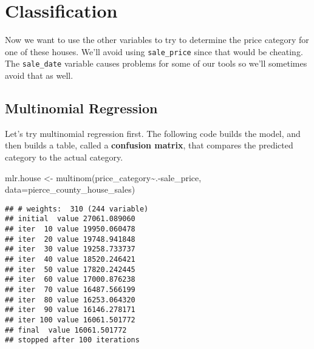 \documentclass[
]{article}
\newenvironment{Shaded}{\begin{snugshade}}{\end{snugshade}}
\newcommand{\AttributeTok}[1]{\textcolor[rgb]{0.77,0.63,0.00}{#1}}
\newcommand{\FunctionTok}[1]{\textcolor[rgb]{0.00,0.00,0.00}{#1}}
\newcommand{\NormalTok}[1]{#1}
\newcommand{\OtherTok}[1]{\textcolor[rgb]{0.56,0.35,0.01}{#1}}
\newcommand{\SpecialCharTok}[1]{\textcolor[rgb]{0.00,0.00,0.00}{#1}}
\begin{document}
\hypertarget{classification}{%
\section{Classification}\label{classification}}

Now we want to use the other variables to try to determine the price
category for one of these houses. We'll avoid using \texttt{sale\_price}
since that would be cheating. The \texttt{sale\_date} variable causes
problems for some of our tools so we'll sometimes avoid that as well.

\hypertarget{multinomial-regression}{%
\subsection{Multinomial Regression}\label{multinomial-regression}}

Let's try multinomial regression first. The following code builds the
model, and then builds a table, called a \textbf{confusion matrix}, that
compares the predicted category to the actual category.

\begin{Shaded}
\begin{Highlighting}[]
\NormalTok{mlr.house }\OtherTok{\textless{}{-}} \FunctionTok{multinom}\NormalTok{(price\_category}\SpecialCharTok{\textasciitilde{}}\NormalTok{.}\SpecialCharTok{{-}}\NormalTok{sale\_price, }\AttributeTok{data=}\NormalTok{pierce\_county\_house\_sales)}
\end{Highlighting}
\end{Shaded}

\begin{verbatim}
## # weights:  310 (244 variable)
## initial  value 27061.089060 
## iter  10 value 19950.060478
## iter  20 value 19748.941848
## iter  30 value 19258.733737
## iter  40 value 18520.246421
## iter  50 value 17820.242445
## iter  60 value 17000.876238
## iter  70 value 16487.566199
## iter  80 value 16253.064320
## iter  90 value 16146.278171
## iter 100 value 16061.501772
## final  value 16061.501772 
## stopped after 100 iterations
\end{verbatim}

\begin{Shaded}
\end{Shaded}
\end{document}
